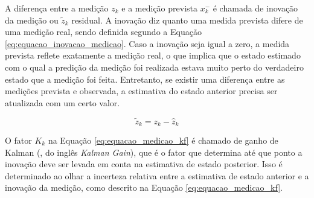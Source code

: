 \documentclass[acronym, symbols, table, deposito]{fei}
\begin{document}
				A diferença entre a medição $z_k$ e a medição prevista $x_{k}^{-}$ é chamada de inovação da medição ou $\tilde{z}_k$ residual. A inovação diz quanto uma medida prevista difere de uma medição real, sendo definida segundo a Equação \eqref{eq:equacao_inovacao_medicao}. Caso a inovação seja igual a zero, a medida prevista reflete exatamente a medição real, o que implica que o estado estimado com o qual a predição da medição foi realizada estava muito perto do verdadeiro estado que a medição foi feita. Entretanto, se existir uma diferença entre as medições prevista e observada, a estimativa do estado anterior precisa ser atualizada com um certo valor.
				
				\begin{equation} \label{eq:equacao_inovacao_medicao}
					\tilde{z}_k = z_k - \hat{z}_k
				\end{equation}
				
%				
%			
				
				O fator $K_k$ na Equação \eqref{eq:equacao_medicao_kf} é chamado de ganho de Kalman (, do inglês \textit{Kalman Gain}), que é o fator que determina até que ponto a inovação deve ser levada em conta na estimativa de estado posterior. Isso é determinado ao olhar a incerteza relativa entre a estimativa de estado anterior e a inovação da medição, como descrito na Equação \eqref{eq:equacao_medicao_kf}.
				
\end{document}
